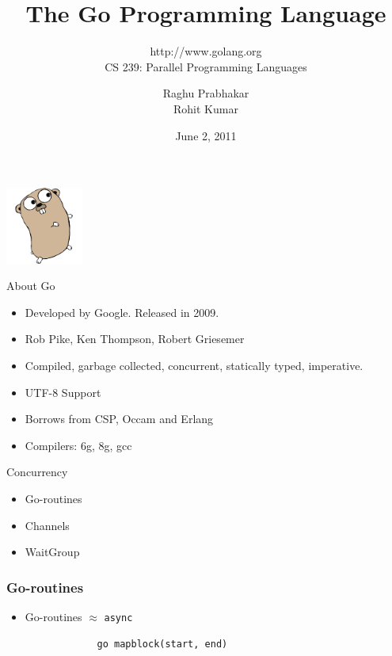 \documentclass{beamer}
\title{The Go Programming Language}
\subtitle{http://www.golang.org \\ CS 239: Parallel Programming Languages}
\author{Raghu Prabhakar \\ Rohit Kumar}
\date{June 2, 2011}
\begin{document}
\begin{frame}
\begin{center}
\includegraphics[width=1in]{gopher.png}
\end{center}
\titlepage
\end{frame}

\begin{frame} {About Go}
\begin{itemize}
  \item Developed by Google. Released in 2009.
  \item Rob Pike, Ken Thompson, Robert Griesemer
  \item Compiled, garbage collected, concurrent, statically typed,
    imperative. 
  \item UTF-8 Support
  \item Borrows from CSP, Occam and Erlang
  \item Compilers: 6g, 8g, gcc 
\end{itemize}
\end{frame}

\begin{frame}{Concurrency}
  \begin{itemize}
    \item Go-routines
    \item Channels
    \item WaitGroup
  \end{itemize}
\end{frame}

\begin{frame} [fragile]
\frametitle{Go-routines}
\begin{itemize}
  \item Go-routines $\approx$ \verb=async=
\end{itemize}
\begin{center}
\begin{verbatim}
                go mapblock(start, end)
\end{verbatim}
\end{center}
\end{frame}
\end{document}
